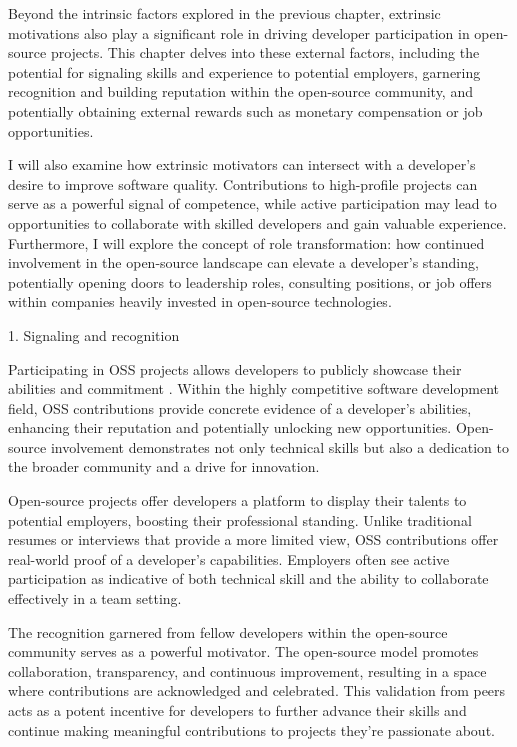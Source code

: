 Beyond the intrinsic factors explored in the previous chapter, extrinsic motivations also play a significant role in driving developer participation in open-source projects. This chapter delves into these external factors, including the potential for signaling skills and experience to potential employers, garnering recognition and building reputation within the open-source community, and potentially obtaining external rewards such as monetary compensation or job opportunities.

I will also examine how extrinsic motivators can intersect with a developer's  desire to improve software quality. Contributions to high-profile projects can serve as a powerful signal of competence, while active participation may lead to opportunities to collaborate with skilled developers and gain valuable experience.  Furthermore, I will explore the concept of role transformation: how continued involvement in the open-source landscape can elevate a developer's standing, potentially opening doors to leadership roles, consulting positions, or  job offers within companies heavily invested in open-source technologies.

1. Signaling and recognition

Participating in OSS projects allows developers to publicly showcase their abilities and commitment \citep{05bitzer2007intrinsic,06ye2003toward,07zhao2024openrank,08zhang2024paid,09lakhani2005hackers,10wu2007empirical,11gerosa2021shifting,12choi2015characteristics,13li2012leadership,15roberts2006understanding,17alexander2002working,18oreg2008exploring}. Within the highly competitive software development field, OSS contributions provide concrete evidence of a developer's abilities, enhancing their reputation and potentially unlocking new opportunities.  Open-source involvement demonstrates not only technical skills but also a dedication to the broader community and a drive for innovation.


Open-source projects offer developers a platform to display their talents to potential employers, boosting their professional standing. Unlike traditional resumes or interviews that provide a more limited view, OSS contributions offer real-world proof of a developer's capabilities. Employers often see active participation as indicative of both technical skill and the ability to collaborate effectively in a team setting.

The recognition garnered from fellow developers within the open-source community serves as a powerful motivator. The open-source model promotes collaboration, transparency, and continuous improvement, resulting in a space where contributions are acknowledged and celebrated. This validation from peers acts as a potent incentive for developers to further advance their skills and continue making meaningful contributions to projects they're passionate about.


